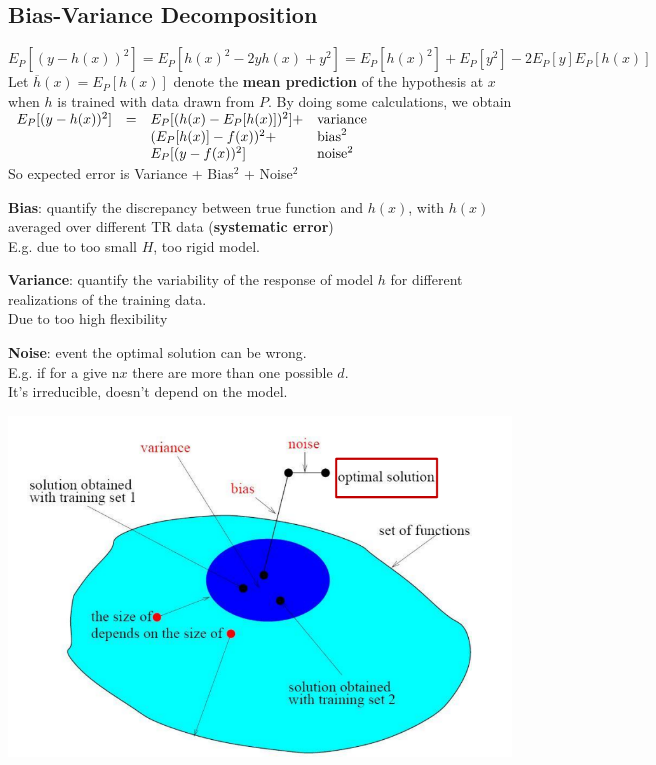 \documentclass[10pt]{report}
\begin{document}
\subsection{Bias-Variance Decomposition}
$$E_P[(y - h(x))^2] = E_P[h(x)^2 - 2yh(x) + y^2] = E_P[h(x)^2] + E_P[y^2] - 2E_P[y]E_P[h(x)]$$
Let $\overline{h}(x) = E_P[h(x)]$ denote the \textbf{mean prediction} of the hypothesis at $x$ when $h$ is trained with data drawn from $P$. By doing some calculations, we obtain $\begin{array}{r c l l}
E_P[(y-h(x))^2] & = & E_P[(h(x) - E_P[h(x)])^2] + & \hbox{variance}\\
 & & (E_P[h(x)] - f(x))^2 + & \hbox{bias}^2 \\
 & & E_P[(y - f(x))^2] & \hbox{noise}^2
\end{array}$\\
So expected error is Variance + Bias$^2$ + Noise$^2$\begin{list}{}{}
	\item \textbf{Bias}: quantify the discrepancy between true function and $h(x)$, with $h(x)$ averaged over different TR data (\textbf{systematic error})\\E.g. due to too small $H$, too rigid model.
	\item \textbf{Variance}: quantify the variability of the response of model $h$ for different realizations of the training data.\\Due to too high flexibility
	\item \textbf{Noise}: event the optimal solution can be wrong.\\E.g. if for a give n$x$ there are more than one possible $d$.\\
	It's irreducible, doesn't depend on the model.
\end{list}
\begin{center}
	\includegraphics[scale=0.5]{24.png}
\end{center}
\end{document}
